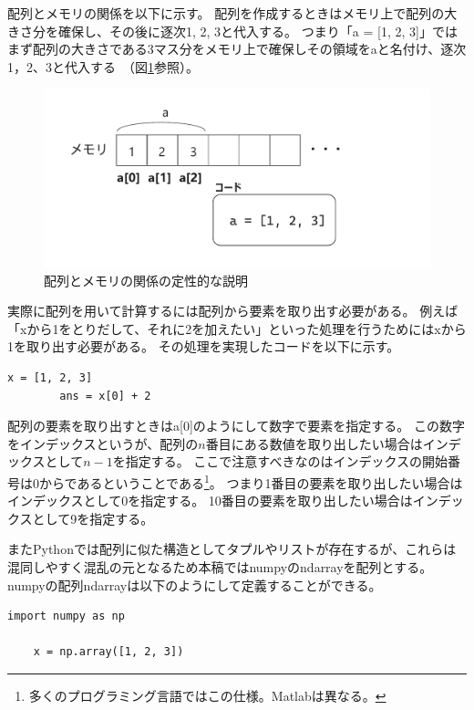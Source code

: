 \documentclass[]{ltjsbook}
\begin{document}
	配列とメモリの関係を以下に示す。
	配列を作成するときはメモリ上で配列の大きさ分を確保し、その後に逐次1, 2, 3と代入する。
	つまり「a = [1, 2, 3]」ではまず配列の大きさである3マス分をメモリ上で確保しその領域をaと名付け、逐次1，2、3と代入する~（図\ref{fig:memory2}参照）。
	\begin{figure}
		\centering
		\includegraphics[width=0.8\linewidth]{figs/memory2.pdf}
		\caption{配列とメモリの関係の定性的な説明}
		\label{fig:memory2}
	\end{figure}

	実際に配列を用いて計算するには配列から要素を取り出す必要がある。
	例えば「xから1をとりだして、それに2を加えたい」といった処理を行うためにはxから1を取り出す必要がある。
	その処理を実現したコードを以下に示す。
	\begin{lstlisting}[caption=array.py, label=array2]
		x = [1, 2, 3]
		ans = x[0] + 2
	\end{lstlisting}
	配列の要素を取り出すときはa[0]のようにして数字で要素を指定する。
	この数字をインデックスというが、配列の$n$番目にある数値を取り出したい場合はインデックスとして$n-1$を指定する。
	ここで注意すべきなのはインデックスの開始番号は0からであるということである\footnote{多くのプログラミング言語ではこの仕様。Matlabは異なる。}。
	つまり1番目の要素を取り出したい場合はインデックスとして0を指定する。
	10番目の要素を取り出したい場合はインデックスとして9を指定する。

	またPythonでは配列に似た構造としてタプルやリストが存在するが、これらは混同しやすく混乱の元となるため本稿ではnumpyのndarrayを配列とする。
	numpyの配列ndarrayは以下のようにして定義することができる。
	\begin{lstlisting}[caption=numpyarray.py, label=ndarray]
	import numpy as np

	x = np.array([1, 2, 3])
	\end{lstlisting}
\end{document}
